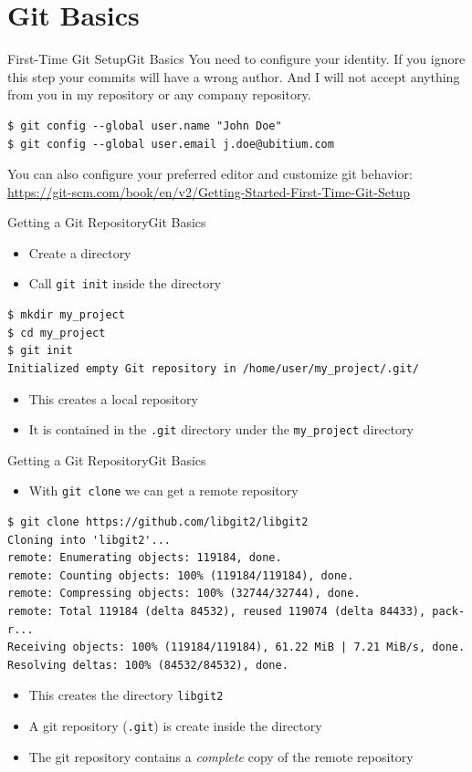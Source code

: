 \documentclass[aspectratio=169]{beamer}
\newcommand{\sectiontitle}{}
\newcommand{\newsection}[1]{\renewcommand{\sectiontitle}{#1}\section{#1}}
\begin{document}
\newsection{Git Basics}
\begin{frame}[fragile]{First-Time Git Setup}{\sectiontitle}
You need to configure your identity. If you ignore this step your commits will
have a wrong author. And I will not accept anything from you in my repository
or any company repository.
\begin{verbatim}
$ git config --global user.name "John Doe"
$ git config --global user.email j.doe@ubitium.com
\end{verbatim}
You can also configure your preferred editor and customize git behavior:
\url{https://git-scm.com/book/en/v2/Getting-Started-First-Time-Git-Setup}
\end{frame}

\begin{frame}[fragile]{Getting a Git Repository}{\sectiontitle}
\begin{itemize}
    \item Create a directory
    \item Call \verb|git init| inside the directory
\end{itemize}
\begin{verbatim}
$ mkdir my_project
$ cd my_project
$ git init
Initialized empty Git repository in /home/user/my_project/.git/
\end{verbatim}
\begin{itemize}
    \item This creates a local repository
    \item It is contained in the \verb|.git| directory under the \verb|my_project| directory
\end{itemize}
\end{frame}

\begin{frame}[fragile]{Getting a Git Repository}{\sectiontitle}
\begin{itemize}
    \item With \verb|git clone| we can get a remote repository
\end{itemize}
\begin{verbatim}
$ git clone https://github.com/libgit2/libgit2
Cloning into 'libgit2'...
remote: Enumerating objects: 119184, done.
remote: Counting objects: 100% (119184/119184), done.
remote: Compressing objects: 100% (32744/32744), done.
remote: Total 119184 (delta 84532), reused 119074 (delta 84433), pack-r...
Receiving objects: 100% (119184/119184), 61.22 MiB | 7.21 MiB/s, done.
Resolving deltas: 100% (84532/84532), done.
\end{verbatim}
\begin{itemize}
    \item This creates the directory \verb|libgit2|
    \item A git repository (\verb|.git|) is create inside the directory
    \item The git repository contains a \emph{complete} copy of the remote repository
\end{itemize}
\end{frame}
\end{document}

